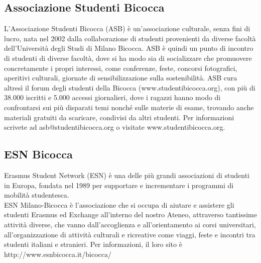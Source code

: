 
\subsection{Associazione Studenti Bicocca}
L'Associazione Studenti Bicocca (ASB) è un'associazione culturale, senza fini di lucro, nata nel 2002 dalla collaborazione di studenti provenienti da diverse facoltà dell'Università degli Studi di Milano Bicocca. ASB è quindi un punto di incontro di studenti di diverse facoltà, dove si ha modo sia di socializzare che promuovere concretamente i propri interessi, come conferenze, feste, concorsi fotografici, aperitivi culturali, giornate di sensibilizzazione sulla sostenibilità. ASB cura altresì il forum degli studenti della Bicocca (www.studentibicocca.org), con più di 38.000 iscritti e 5.000 accessi giornalieri, dove i ragazzi hanno modo di confrontarsi sui più disparati temi nonché sulle materie di esame, trovando anche materiali gratuiti da scaricare, condivisi da altri studenti. Per informazioni scrivete ad asb@studentibicocca.org o visitate www.studentibicocca.org.

\subsection{ESN Bicocca}
Erasmus Student Network (ESN) è una delle più grandi associazioni di studenti in Europa, fondata nel 1989 per supportare e incrementare i programmi di mobilità studentesca.\\
ESN Milano-Bicocca è l'associazione che si occupa di aiutare e assistere gli studenti Erasmus ed Exchange all'interno del nostro Ateneo, attraverso tantissime attività diverse, che vanno dall'accoglienza e all'orientamento ai corsi universitari, all'organizzazione di attività culturali e ricreative come viaggi, feste e incontri tra studenti italiani e stranieri. 
Per informazioni, il loro sito è http://www.esnbicocca.it/bicocca/
